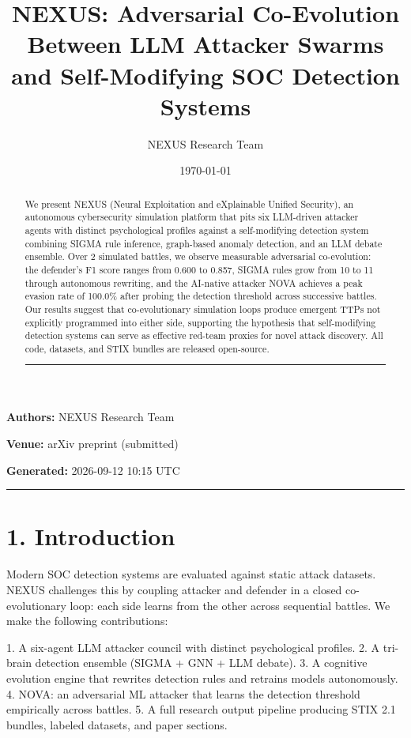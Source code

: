 \documentclass{article}
\title{NEXUS: Adversarial Co-Evolution Between LLM Attacker Swarms and Self-Modifying SOC Detection Systems}
\author{NEXUS Research Team}
\date{\today}
\begin{document}
\maketitle


\textbf{Authors:} NEXUS Research Team  

\textbf{Venue:} arXiv preprint (submitted)  

\textbf{Generated:} 2026-09-12 10:15 UTC  

\hrule\vspace{6pt}

\begin{abstract}

We present NEXUS (Neural Exploitation and eXplainable Unified Security), an autonomous cybersecurity simulation platform that pits six LLM-driven attacker agents with distinct psychological profiles against a self-modifying detection system combining SIGMA rule inference, graph-based anomaly detection, and an LLM debate ensemble. Over 2 simulated battles, we observe measurable adversarial co-evolution: the defender's F1 score ranges from 0.600 to 0.857, SIGMA rules grow from 10 to 11 through autonomous rewriting, and the AI-native attacker NOVA achieves a peak evasion rate of 100.0\% after probing the detection threshold across successive battles. Our results suggest that co-evolutionary simulation loops produce emergent TTPs not explicitly programmed into either side, supporting the hypothesis that self-modifying detection systems can serve as effective red-team proxies for novel attack discovery. All code, datasets, and STIX bundles are released open-source.


\hrule\vspace{6pt}

\end{abstract}

\section{1. Introduction}

Modern SOC detection systems are evaluated against static attack datasets. NEXUS challenges this by coupling attacker and defender in a closed co-evolutionary loop: each side learns from the other across sequential battles. We make the following contributions:

1. A six-agent LLM attacker council with distinct psychological profiles.
2. A tri-brain detection ensemble (SIGMA + GNN + LLM debate).
3. A cognitive evolution engine that rewrites detection rules and retrains models autonomously.
4. NOVA: an adversarial ML attacker that learns the detection threshold empirically across battles.
5. A full research output pipeline producing STIX 2.1 bundles, labeled datasets, and paper sections.
\end{document}
